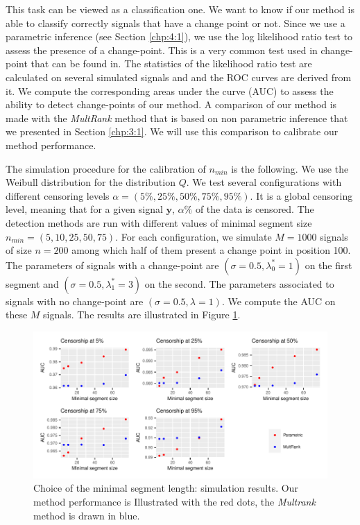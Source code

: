This task can be viewed as a classification one. We want to know if our method is able to classify correctly signals that have a change point or not. Since we use a parametric inference (see Section \ref{chp:4:1}), we use the log likelihood ratio test to assess the presence of a change-point. This is a very common test used in change-point that can be found in. The statistics of the likelihood ratio test are calculated on several simulated signals and and the ROC curves \citep{Fawcett2006} are derived from it. We compute the corresponding areas under the curve (AUC) to assess the ability to detect change-points of our method. A comparison of our method is made with the \textit{MultRank} method that is based on non parametric inference that we presented in Section \ref{chp:3:1}. We will use this comparison to calibrate our method performance.  

The simulation procedure for the calibration of $n_{min}$ is the following. We use the Weibull distribution for the distribution $Q$. We test several configurations with different censoring levels $\alpha = (5\%,25\%,50\%,75\%,95\%)$. It is a global censoring level, meaning that for a given signal $\bm y$, $\alpha\%$ of the data is censored. The detection methods are run with different values of minimal segment size $n_{min} = (5,10,25,50,75)$. For each configuration, we simulate $M = 1000$ signals of size $n = 200$ among which half of them present a change point in position 100. The parameters of signals with a change-point are $(\sigma = 0.5,\lambda^*_0 = 1)$ on the first segment and $(\sigma = 0.5,\lambda^*_1 = 3)$ on the second. The parameters associated to signals with no change-point are $(\sigma = 0.5,\lambda = 1)$. We compute the AUC on these $M$ signals. The results are illustrated in Figure \ref{fig:sim_minseg}.      

\begin{figure}[ht]
\centering
\includegraphics{figs/Chap4/sim_minseg.pdf}
\caption{Choice of the minimal segment length: simulation results. Our method performance is Illustrated with the red dots, the \textit{Multrank} method is drawn in blue.}
\label{fig:sim_minseg}
\end{figure}

